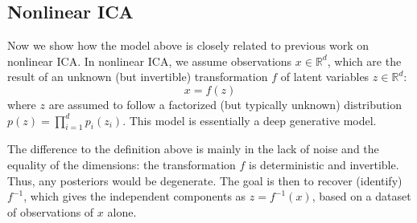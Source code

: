 \subsection{Nonlinear ICA \cite{nonlinear_ICA}}
Now we show how the model above is closely related to previous work on nonlinear ICA. In nonlinear ICA, we assume observations $x \in \mathbb{R}^{d}$, which are the result of an unknown (but invertible) transformation $f$ of latent variables $z \in \mathbb{R}^{d}$:
\begin{equation*}
x=f(z)
\end{equation*}
where $z$ are assumed to follow a factorized (but typically unknown) distribution $p(z)=\prod_{i=1}^{d} p_{i} \left(z_{i}\right)$. This model is essentially a deep generative model.

The difference to the definition above is mainly in the lack of noise and the equality of the dimensions: the transformation $f$ is deterministic and invertible. Thus, any posteriors would be degenerate. The goal is then to recover (identify) $f^{-1}$, which gives the independent components as $z=f^{-1}(x)$, based on a dataset of observations of $x$ alone.
